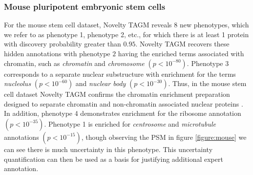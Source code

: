 \documentclass[12pt,english]{article}
\begin{document}
\subsubsection{Mouse pluripotent embryonic stem cells}
For the mouse stem cell dataset, Novelty TAGM reveals $8$ new phenotypes, which we refer to as phenotype 1, phenotype 2, etc., for which there is at least 1 protein with discovery probability greater than $0.95$. Novelty TAGM recovers these hidden annotations with phenotype $2$ having the enriched terms associated with chromatin, such as \textit{chromatin} and \textit{chromosome} $(p < 10^{-80})$. Phenotype 3 corresponds to a separate nuclear substructure with enrichment for the terms \textit{nucleolus} $(p < 10^{-60})$ and \textit{nuclear body} $(p < 10^{-30})$. Thus, in the mouse stem cell dataset Novelty TAGM confirms the chromatin enrichment preparation designed to separate chromatin and non-chromatin associated nuclear proteins \citep{Mulvey:2017}. In addition, phenotype 4 demonstrates enrichment for the ribosome annotation $(p < 10^{-35})$. Phenotype 1 is enriched for \textit{centrosome} and \textit{microtubule} annotations $(p < 10^{-15})$, though observing the PSM in figure \ref{figure:mouse} we can see there is much uncertainty in this phenotype. This uncertainty quantification can then be used as a basis for justifying additional expert annotation.
\end{document}
